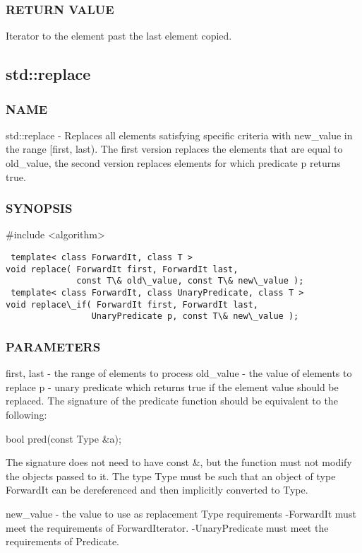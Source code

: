 \subsubsection{RETURN VALUE}
Iterator to the element past the last element copied.



\subsection{std::replace}

\subsubsection{NAME}
std::replace - Replaces all elements satisfying specific criteria with new\_value in the range [first, last). The first version replaces the elements that are equal to old\_value, the second version replaces elements for which predicate p returns true.

\subsubsection{SYNOPSIS}
\#include <algorithm>

\begin{lstlisting}
 template< class ForwardIt, class T >
void replace( ForwardIt first, ForwardIt last,
              const T\& old\_value, const T\& new\_value );
 template< class ForwardIt, class UnaryPredicate, class T >
void replace\_if( ForwardIt first, ForwardIt last,
                 UnaryPredicate p, const T\& new\_value );
\end{lstlisting}

\subsubsection{PARAMETERS}
first, last - the range of elements to process
old\_value - the value of elements to replace
p - unary predicate which returns true  if the element value should be replaced.
The signature of the predicate function should be equivalent to the following:

 bool pred(const Type \&a);

The signature does not need to have const \&, but the function must not modify the objects passed to it.
The type Type must be such that an object of type ForwardIt can be dereferenced and then implicitly converted to Type.

new\_value - the value to use as replacement
 Type requirements
 -ForwardIt must meet the requirements of ForwardIterator.
 -UnaryPredicate must meet the requirements of Predicate.

